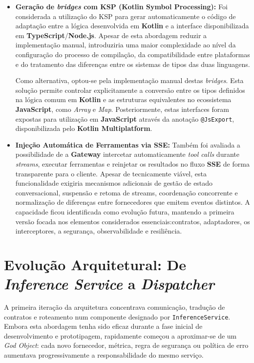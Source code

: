 \begin{itemize}

\item \textbf{Geração de \textit{bridges} com KSP (Kotlin Symbol Processing):} 
Foi considerada a utilização do KSP para gerar automaticamente o código de adaptação entre a lógica desenvolvida em \textbf{Kotlin} e a interface disponibilizada em \textbf{TypeScript}/\textbf{Node.js}. Apesar de esta abordagem reduzir a implementação manual, introduziria uma maior complexidade ao nível da configuração do processo de compilação, da compatibilidade entre plataformas e do tratamento das diferenças entre os sistemas de tipos das duas linguagens.

Como alternativa, optou-se pela implementação manual destas \textit{bridges}. Esta solução permite controlar explicitamente a conversão entre os tipos definidos na lógica comum em \textbf{Kotlin} e as estruturas equivalentes no ecossistema \textbf{JavaScript}, como \textit{Array} e \textit{Map}. Posteriormente, estas interfaces foram expostas para utilização em \textbf{JavaScript} através da anotação \texttt{@JsExport}, disponibilizada pelo \textbf{Kotlin Multiplatform}.

\item \textbf{Injeção Automática de Ferramentas via SSE:}
Também foi avaliada a possibilidade de a \textbf{Gateway} intercetar automaticamente \textit{tool calls} durante \textit{streams}, executar ferramentas e reinjetar os resultados no fluxo \textbf{SSE} de forma transparente para o cliente. Apesar de tecnicamente viável, esta funcionalidade exigiria mecanismos adicionais de gestão de estado conversacional, suspensão e retoma de streams, coordenação concorrente e normalização de diferenças entre fornecedores que emitem eventos distintos. A capacidade ficou identificada como evolução futura, mantendo a primeira versão focada nos elementos considerados essenciais:contratos, adaptadores, os interceptores, a segurança, observabilidade e resiliência.
\end{itemize}


\section{Evolução Arquitetural: De \textit{Inference Service} a \textit{Dispatcher}}

A primeira iteração da arquitetura concentrava comunicação, tradução de contratos e roteamento num componente designado por \texttt{InferenceService}. Embora esta abordagem tenha sido eficaz durante a fase inicial de desenvolvimento e prototipagem, rapidamente começou a aproximar-se de um \textit{God Object}\cite{ref_GodObject}: cada novo fornecedor, métrica, regra de segurança ou política de erro aumentava progressivamente a responsabilidade do mesmo serviço.

